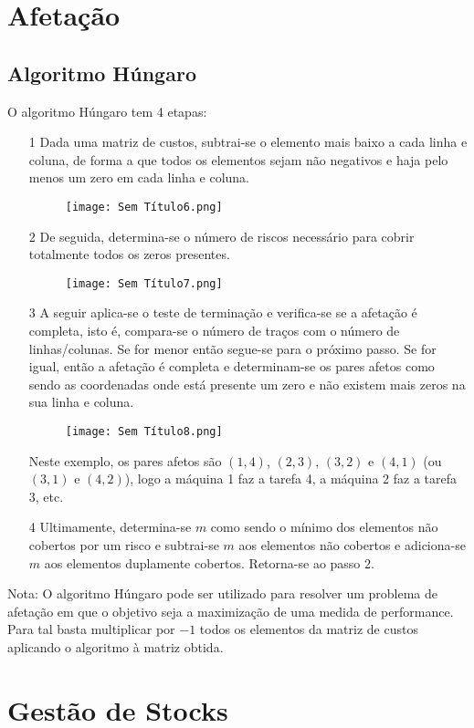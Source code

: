\documentclass[10pt,a4paper]{report}
\begin{document}
\section{Afetação}
\subsection{Algoritmo Húngaro}
O algoritmo Húngaro tem 4 etapas:
\begin{itemize}
\item[1] Dada uma matriz de custos, subtrai-se o elemento mais baixo a cada linha e coluna, de forma a que todos os elementos sejam não negativos e haja pelo menos um zero em cada linha e coluna.
\begin{figure}[H]
\centering
\texttt{[image: Sem Título6.png]}
\end{figure}
\item[2] De seguida, determina-se o número de riscos necessário para cobrir totalmente todos os zeros presentes.
\begin{figure}[H]
\centering
\texttt{[image: Sem Título7.png]}
\end{figure}
\item[3] A seguir aplica-se o teste de terminação e verifica-se se a afetação é completa, isto é, compara-se o número de traços com o número de linhas/colunas. Se for menor então segue-se para o próximo passo. Se for igual, então a afetação é completa e determinam-se os pares afetos como sendo as coordenadas onde está presente um zero e não existem mais zeros na sua linha e coluna.
\begin{figure}[H]
\centering
\texttt{[image: Sem Título8.png]}
\end{figure}
Neste exemplo, os pares afetos são $(1,4)$, $(2,3)$, $(3,2)$ e $(4,1)$ (ou $(3,1)$ e $(4,2)$), logo a máquina 1 faz a tarefa 4, a máquina 2 faz a tarefa 3, etc.
\item[4] Ultimamente, determina-se $m$ como sendo o mínimo dos elementos não cobertos por um risco e subtrai-se $m$ aos elementos não cobertos e adiciona-se $m$ aos elementos duplamente cobertos. Retorna-se ao passo 2.
\end{itemize}

Nota: O algoritmo Húngaro pode ser utilizado para resolver um problema de afetação em que o objetivo seja a maximização de uma medida de performance. Para tal basta multiplicar por $-1$ todos os elementos da matriz de custos aplicando o algoritmo à matriz obtida.

\section{Gestão de Stocks}
\end{document}
